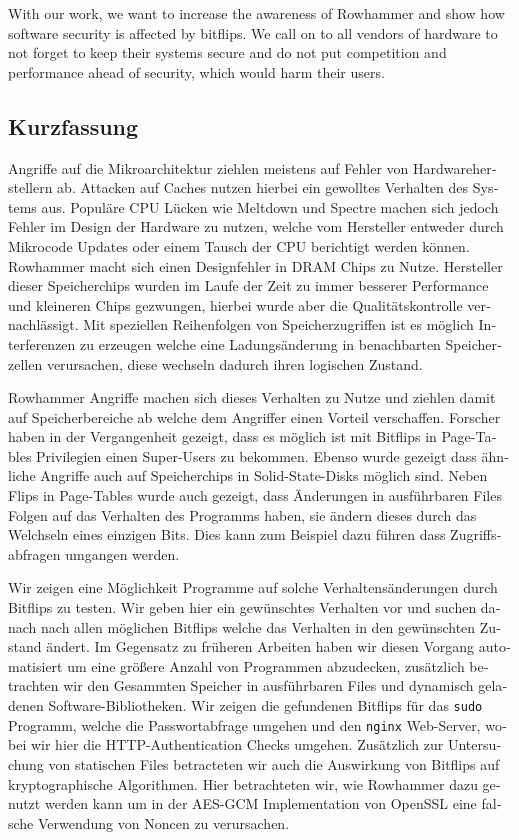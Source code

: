 With our work, we want to increase the awareness of Rowhammer and show how
software security is affected by bitflips. We call on to all vendors of hardware
to not forget to keep their systems secure and do not put competition and
performance ahead of security, which would harm their users.
\cleardoublepage
{}
{}
\begin{otherlanguage}{ngerman}
\chapter*{Kurzfassung}
\label{cha:kurzfassung}

Angriffe auf die Mikroarchitektur ziehlen meistens auf Fehler von
Hardwareherstellern ab. Attacken auf Caches nutzen hierbei ein gewolltes
Verhalten des Systems aus. Populäre CPU Lücken wie Meltdown und Spectre machen
sich jedoch Fehler im Design der Hardware zu nutzen, welche vom Hersteller
entweder durch Mikrocode Updates oder einem Tausch der CPU berichtigt werden
können. Rowhammer macht sich einen Designfehler in DRAM Chips zu Nutze.
Hersteller dieser Speicherchips wurden im Laufe der Zeit zu immer besserer
Performance und kleineren Chips gezwungen, hierbei wurde aber die
Qualitätskontrolle vernachlässigt. Mit speziellen Reihenfolgen von
Speicherzugriffen ist es möglich Interferenzen zu erzeugen welche eine
Ladungsänderung in benachbarten Speicherzellen verursachen, diese wechseln
dadurch ihren logischen Zustand.

Rowhammer Angriffe machen sich dieses Verhalten zu Nutze und ziehlen damit auf
Speicherbereiche ab welche dem Angriffer einen Vorteil verschaffen. Forscher
haben in der Vergangenheit gezeigt, dass es möglich ist mit Bitflips in
Page-Tables Privilegien einen Super-Users zu bekommen. Ebenso wurde gezeigt
dass ähnliche Angriffe auch auf Speicherchips in Solid-State-Disks möglich
sind. Neben Flips in Page-Tables wurde auch gezeigt, dass Änderungen in
ausführbaren Files Folgen auf das Verhalten des Programms haben, sie ändern
dieses durch das Welchseln eines einzigen Bits. Dies kann zum Beispiel dazu
führen dass Zugriffsabfragen umgangen werden.

Wir zeigen eine Möglichkeit Programme auf solche Verhaltensänderungen durch
Bitflips zu testen. Wir geben hier ein gewünschtes Verhalten vor und suchen
danach nach allen möglichen Bitflips welche das Verhalten in den gewünschten
Zustand ändert. Im Gegensatz zu früheren Arbeiten haben wir diesen Vorgang
automatisiert um eine größere Anzahl von Programmen abzudecken, zusätzlich
betrachten wir den Gesammten Speicher in ausführbaren Files und dynamisch
geladenen Software-Bibliotheken. Wir zeigen die gefundenen Bitflips für das
\texttt{sudo} Programm, welche die Passwortabfrage umgehen und den
\texttt{nginx} Web-Server, wobei wir hier die HTTP-Authentication Checks
umgehen. Zusätzlich zur Untersuchung von statischen Files betracteten wir auch
die Auswirkung von Bitflips auf kryptographische Algorithmen. Hier betrachteten
wir, wie Rowhammer dazu genutzt werden kann um in der AES-GCM Implementation von
OpenSSL eine falsche Verwendung von Noncen zu verursachen.


\end{otherlanguage}
